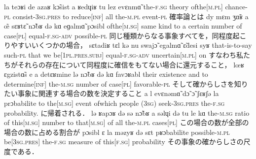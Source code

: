 \documentclass{ltjsarticle}
\newcommand\liaison{\hspace*{0.1em}\raisebox{-0.8ex}{\rotatebox{90}{(}}\hspace*{0.1em}}
\begin{document}
         {la teɔʁi de azaʁ {k\~{ɔ}sist\liaison} a ʁedɥiʁ tu {lez\liaison} evɛnm\~{ɑ}}
         {the-\textsc{f}.\textsc{sg} theory {of{\textunderscore}the[\textsc{m}.\textsc{pl}]} chance-\textsc{pl} consist-3\textsc{sg}.\textsc{pres} to {reduce[\textsc{inf}]} all the-\textsc{m}.\textsc{pl} event-\textsc{pl}}
         {確率論とは}
         {dy mɛm {ʒ\~{ɑ}ʁ{\liaison}} a \~{œ} sɛʁt\~{ɛ} n\~{ɔ}bʁ də kɑ eɡalm\~{ɑ} pɔsibl}
         {{of{\textunderscore}the[\textsc{m}.\textsc{sg}]} same kind to a certain number of {case[\textsc{pl}]} equal-\textsc{f}.\textsc{sg}-\textsc{adv} possible-\textsc{pl}}
         {同じ種類からなる事象すべてを，同程度起こりやすいいくつかの場合，}
         {sɛtadiʁ tɛl kə nu swaj\~{ɔ} egalm\~{ɑ} \~{ɛ}desi syʁ}
         {that-is-to-say such-\textsc{pl} that we {be[1\textsc{pl}.\textsc{pres}.\textsc{subj}]} equal-\textsc{f}.\textsc{sg}-\textsc{adv} {uncertain[\textsc{m}.\textsc{pl}]} on}
         {すなわち私たちがそれらの存在について同程度に確信をもてない場合に還元すること，}
         {{lœʁ\liaison} ɛgzist\~{ɑ}s e a detɛʁmine lə n\~{ɔ}bʁ də kɑ {favɔʁabl\liaison}}
         {their existence and to {determine[\textsc{inf}]} the-\textsc{m}.\textsc{sg} number of {case[\textsc{pl}]} favorable-\textsc{pl}}
         {そして確からしさを知りたい事象に関連する場合の数を決定すること}
         {a {l{\liaison}} evɛnəm\~{ɑ} d\~{ɔ} \~{ɔ} ʃɛʁʃə la prɔbabilite}
         {to {the[\textsc{m}.\textsc{sg}]} event of{\textunderscore}which {people (3\textsc{sg})} seek-3\textsc{sg}.\textsc{pres} {the-\textsc{f}.\textsc{sg}} probability.}
         {に帰着される．}
         {lə ʁapɔʁ də sə {n\~{ɔ}bʁ{\liaison}} a səlɥi də tu le kɑ}
         {the-\textsc{m}.\textsc{sg} ratio of {this[\textsc{m}.\textsc{sg}]} number to {that[\textsc{m}.\textsc{sg}]} of all {the-\textsc{m}.\textsc{pl}} {cases[\textsc{pl}]}}
         {この場合の数が全部の場合の数に占める割合が}
         {{pɔsibl{\liaison}} ɛ la məzyʁ də sɛt pʁɔbabilite}
         {possible-\textsc{m}.\textsc{pl} {be[3\textsc{sg}.\textsc{pres}]} the-\textsc{f}.\textsc{sg} measure of {this[\textsc{f}.\textsc{sg}]} probability}
         {その事象の確からしさの尺度である．}
\end{document}
